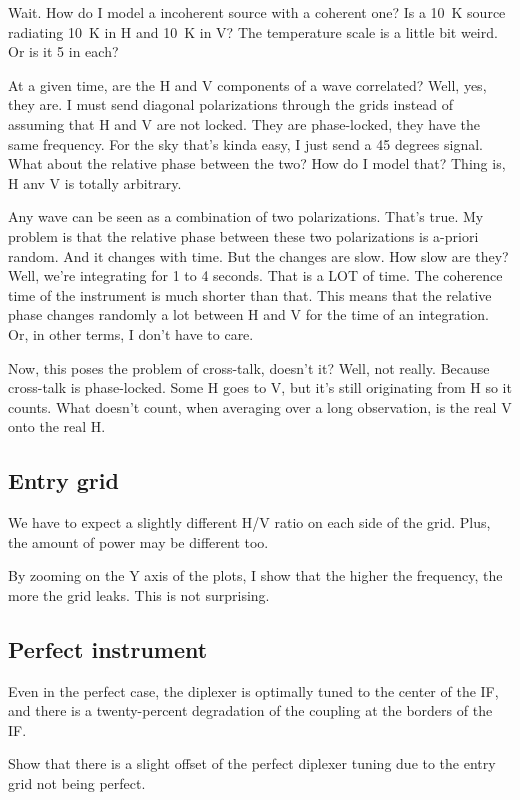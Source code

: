 Wait.  How do I model a incoherent source with a coherent one?
Is a \SI{10}{\kelvin} source radiating \SI{10}{\kelvin} in H and \SI{10}{\kelvin} in V?
The temperature scale is a little bit weird.  Or is it 5 in each?

At a given time, are the H and V components of a wave correlated?  Well, yes, they are.
I must send diagonal polarizations through the grids instead of assuming that H and V are not locked.  They are phase-locked, they have the same frequency.  For the sky that's kinda easy, I just send a 45 degrees signal.  What about the relative phase between the two?  How do I model that?  Thing is, H anv V is totally arbitrary.

Any wave can be seen as a combination of two polarizations.  That's true.  My problem
is that the relative phase between these two polarizations is a-priori random.  And it changes with time.  But the changes are slow.
How slow are they?  Well, we're integrating for 1 to 4 seconds.  That is a LOT of time.
The coherence time of the instrument is much shorter than that.  This means that the relative phase changes randomly a lot between H and V for the time of an integration.  Or, in other terms, I don't have to care.

Now, this poses the problem of cross-talk, doesn't it?  Well, not really.  Because cross-talk is phase-locked.  Some H goes to V, but it's still originating from H so it counts.  What doesn't count, when averaging over a long observation, is the real V onto the real H.

\subsection{Entry grid}
We have to expect a slightly different H/V ratio on each side of the grid.
Plus, the amount of power may be different too.

By zooming on the Y axis of the plots, I show that the higher the frequency, the more the grid leaks.  This is not surprising.

\subsection{Perfect instrument}
Even in the perfect case, the diplexer is optimally tuned to the center of the IF, and there is a twenty-percent degradation of the coupling at the borders of the IF.

Show that there is a slight offset of the perfect diplexer tuning due to the entry grid not being perfect.

